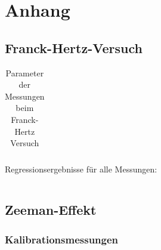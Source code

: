 \chapter {Anhang}

\section{Franck-Hertz-Versuch}
\label{sec:franck-hertz-anhang}

\begin{table}[H]
	\centering
	\begin{tabular}{|c|c|c|c|} \hline

		
	\end{tabular}
	\caption{Parameter der Messungen beim Franck-Hertz Versuch}
	\label{tab:fh_params}
\end{table}


Regressionsergebnisse für alle Messungen:
\begin{longtable}{|c|c|c|c|c|c|}
	\hline
	
\end{longtable}

\section{Zeeman-Effekt}

\subsection{Kalibrationsmessungen}

